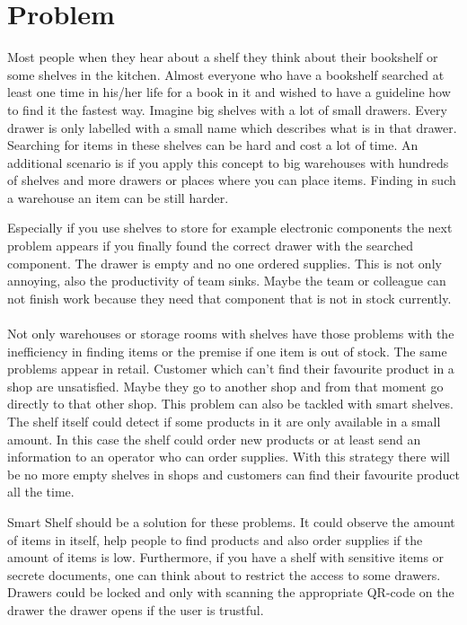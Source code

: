 \documentclass{sigchi}
\begin{document}
\section{Problem}
Most people when they hear about a shelf they think about their bookshelf or some shelves in the kitchen. 
Almost everyone who have a bookshelf searched at least one time in his/her life for a book in it and wished to have a guideline how to find it the fastest way. 
Imagine big shelves with a lot of small drawers. 
Every drawer is only labelled with a small name which describes what is in that drawer. 
Searching for items in these shelves can be hard and cost a lot of time. 
An additional scenario is if you apply this concept to big warehouses with hundreds of shelves and more drawers or places where you can place items. 
Finding in such a warehouse an item can be still harder. 

Especially if you use shelves to store for example electronic components the next problem appears if you finally found the correct drawer with the searched component. 
The drawer is empty and no one ordered supplies. 
This is not only annoying, also the productivity of team sinks. 
Maybe the team or colleague can not finish work because they need that component that is not in stock currently. 
\\
\\
Not only warehouses or storage rooms with shelves have those problems with the inefficiency in finding items or the premise if one item is out of stock. 
The same problems appear in retail. 
Customer which can't find their favourite product in a shop are unsatisfied. 
Maybe they go to another shop and from that moment go directly to that other shop. 
This problem can also be tackled with smart shelves. 
The shelf itself could detect if some products in it are only available in a small amount. 
In this case the shelf could order new products or at least send an information to an operator who can order supplies. 
With this strategy there will be no more empty shelves in shops and customers can find their favourite product all the time. 

Smart Shelf should be a solution for these problems. 
It could observe the amount of items in itself, help people to find products and also order supplies if the amount of items is low. 
Furthermore, if you have a shelf with sensitive items or secrete documents, one can think about to restrict the access to some drawers. 
Drawers could be locked and only with scanning the appropriate QR-code on the drawer the drawer opens if the user is trustful. 
\end{document}

